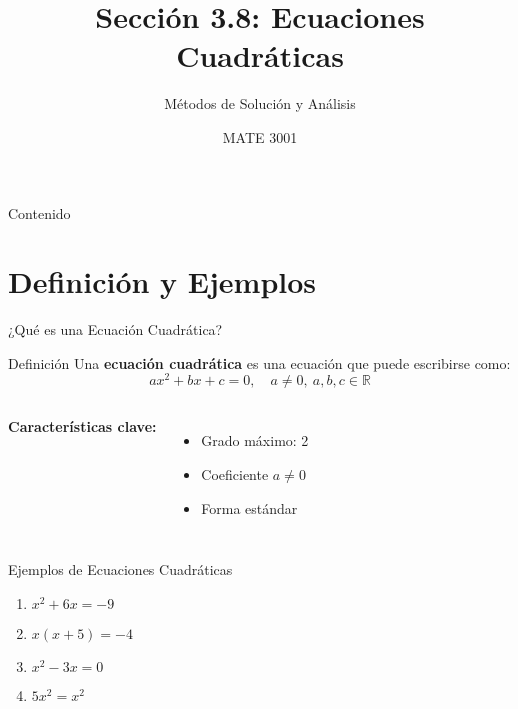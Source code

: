 \documentclass[aspectratio=169]{beamer}
\title[Ecuaciones Cuadráticas]{Sección 3.8: Ecuaciones Cuadráticas}
\subtitle{Métodos de Solución y Análisis}
\author{MATE 3001}
\date{}
\begin{document}
\begin{frame}
\titlepage
\end{frame}

\begin{frame}{Contenido}
\tableofcontents
\end{frame}

\section{Definición y Ejemplos}

\begin{frame}{¿Qué es una Ecuación Cuadrática?}
\begin{block}{Definición}
Una \textbf{ecuación cuadrática} es una ecuación que puede escribirse como:
\[
\boxed{ax^2 + bx + c = 0, \quad a\neq 0,\ a,b,c\in\mathbb{R}}
\]
\end{block}

\pause
\vspace{0.5cm}
\begin{columns}[T]
\textbf{Características clave:}
\begin{itemize}
\item Grado máximo: 2
\item Coeficiente $a \neq 0$
\item Forma estándar
\end{itemize}

\begin{center}
\end{center}
\end{columns}
\end{frame}

\begin{frame}{Ejemplos de Ecuaciones Cuadráticas}
\begin{enumerate}
\item<1-> $x^2 + 6x = -9$ 
\item<2-> $x(x+5) = -4$ 
\item<3-> $x^2 - 3x = 0$ 
\item<4-> $5x^2 = x^2$ 
\end{enumerate}

\end{frame}
\end{document}
